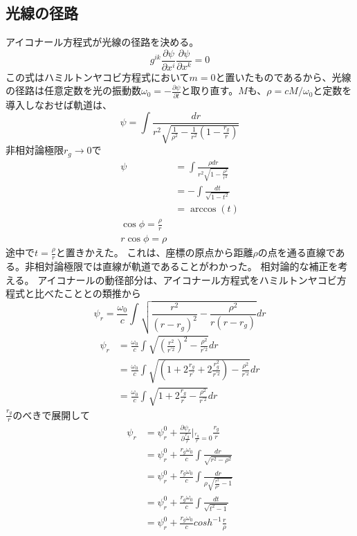 \documentclass{jsarticle}
\newcommand{\pder}[2][]{\frac{\partial#1}{\partial#2}}
\newcommand{\beq}{\begin{equation}}
\newcommand{\eeq}{\end{equation}}
\newcommand{\revrt}{\frac{1}{r^2}}
\newcommand{\rgr}{1 - \frac{r_g}{r}}
\begin{document}
\subsection{光線の径路}
アイコナール方程式が光線の径路を決める。
\beq
    g^{ik} \pder[\psi]{x^i}\pder[\psi]{x^k} = 0
\eeq
この式はハミルトンヤコビ方程式において$m=0$と置いたものであるから、光線の径路は任意定数を光の振動数$\omega_0 = - \pder[\psi]{t}$と取り直す。$M$も、$\rho = cM / \omega_0$と定数を導入しなおせば軌道は、
\beq
    \psi = \int \frac{dr}{r^2\sqrt{\frac{1}{\rho^2} - \revrt (\rgr)}}
\eeq
非相対論極限$r_g \rightarrow 0$で
\begin{align}
    \psi &= \int \frac{\rho dr}{r^2\sqrt{1 - \frac{\rho^2}{r^2}}}\\
         &= - \int \frac{dt}{\sqrt{1 - t^2}}\\
         &= \arccos(t)\\
    \cos\phi = \frac{\rho}{r}\\
    r \cos\phi = \rho
\end{align}
途中で$t = \frac{\rho}{r}$と置きかえた。
これは、座標の原点から距離$\rho$の点を通る直線である。非相対論極限では直線が軌道であることがわかった。
相対論的な補正を考える。
アイコナールの動径部分は、アイコナール方程式をハミルトンヤコビ方程式と比べたこととの類推から
\beq
    \psi_r = \frac{\omega_0}{c} \int \sqrt{\frac{r^2}{(r-r_g)^2} - \frac{\rho^2}{r(r-r_g)}} dr
\eeq
\begin{align}
    \psi_r &= \frac{\omega_0}{c} \int \sqrt{(\frac{r^2}{r^{\prime 2}})^2 - \frac{\rho^2}{r^{\prime 2}}} dr\\
           &= \frac{\omega_0}{c} \int \sqrt{(1 + 2\frac{r_g}{r^\prime} + 2\frac{r_g^2}{r^{\prime 2}}) - \frac{\rho^2}{r^{\prime 2}}} dr\\
           &= \frac{\omega_0}{c} \int \sqrt{1 + 2\frac{r_g}{r^\prime} - \frac{\rho^2}{r^{\prime 2}}} dr
\end{align}
$\frac{r_g}{r}$のべきで展開して
\begin{align}
    \psi_r &= \psi_r^0 + \pder[\psi_r]{\frac{r_g}{r}}|_{\frac{r_g}{r} = 0} \frac{r_g}{r}\\
           &= \psi_r^0 + \frac{r_g \omega_0}{c} \int \frac{dr}{\sqrt{r^2 - \rho^2}}\\
           &= \psi_r^0 + \frac{r_g \omega_0}{c} \int \frac{dr}{\rho\sqrt{\frac{r^2}{\rho^2} - 1}}\\
           &= \psi_r^0 + \frac{r_g \omega_0}{c} \int \frac{dt}{\sqrt{t^2 - 1}}\\
           &= \psi_r^0 + \frac{r_g \omega_0}{c} cosh^{-1}\frac{r}{\rho}
\end{align}
\end{document}
